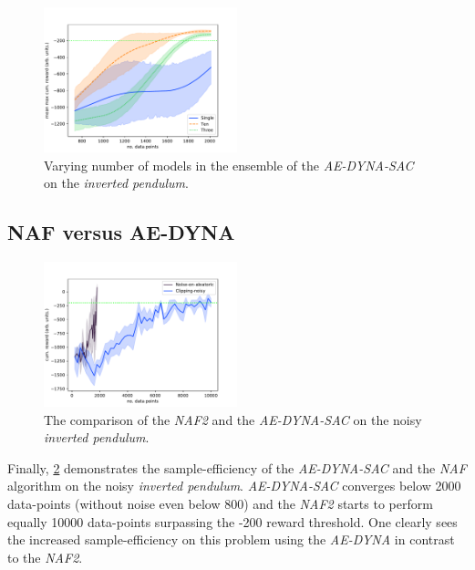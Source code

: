 \documentclass[
reprint,nofootinbib,
amsmath,amssymb,amsfonts,clevref,
aps,
prstab,
]{revtex4-2}
\begin{document}
	\begin{figure}[h]
		\centering
		\includegraphics*[width=0.5\textwidth]{Figures/Comparison_models_sizes}
		\caption{Varying number of models in the ensemble of the \emph{AE-DYNA-SAC} on the \emph{inverted pendulum}.}
		\label{fig:Compare_models_sizes}
	\end{figure}
	\subsection{NAF versus AE-DYNA}
		\begin{figure}[h]
		\centering
		\includegraphics*[width=0.5\textwidth]{Figures/Comparison_NAF_AE-DYNA}
		\caption{The comparison of the \emph{NAF2} and the \emph{AE-DYNA-SAC} on the noisy \emph{inverted pendulum}.}
		\label{fig:comparsion_NAF_AE-DYNA}
	\end{figure}
	
	Finally, \cref{fig:comparsion_NAF_AE-DYNA} demonstrates the sample-efficiency of the \emph{AE-DYNA-SAC} and the \emph{NAF} algorithm on the noisy \emph{inverted pendulum}. \emph{AE-DYNA-SAC} converges below 2000 data-points (without noise even below 800) and the \emph{NAF2} starts to perform equally 10000 data-points surpassing the -200 reward threshold. One clearly sees the increased sample-efficiency on this problem using the \emph{AE-DYNA} in contrast to the \emph{NAF2}.

	
	
\end{document}
